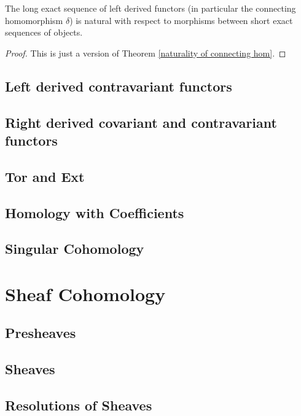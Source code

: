 \documentclass[english,letterpaper]{article}%
\numberwithin{equation}{section}
\numberwithin{figure}{section}
\numberwithin{table}{section}
\theoremstyle{definition}
\theoremstyle{definition}
\theoremstyle{definition}
\theoremstyle{plain}
\theoremstyle{plain}
\theoremstyle{plain}
\theoremstyle{plain}
\theoremstyle{remark}
\theoremstyle{remark}
\begin{document}
\begin{prop}
    The long exact sequence of left derived functors (in particular the connecting homomorphism $\delta$) is natural with respect to morphisms between short exact sequences of objects.
\end{prop}
\begin{proof}
    This is just a version of Theorem \ref{naturality of connecting hom}.
\end{proof}




\subsection{Left derived contravariant functors}

\subsection{Right derived covariant and contravariant functors}

\subsection{Tor and Ext}

\subsection{Homology with Coefficients}

\subsection{Singular Cohomology}







\section{Sheaf Cohomology}
\subsection{Presheaves}

\subsection{Sheaves}

\subsection{Resolutions of Sheaves}
\end{document}

